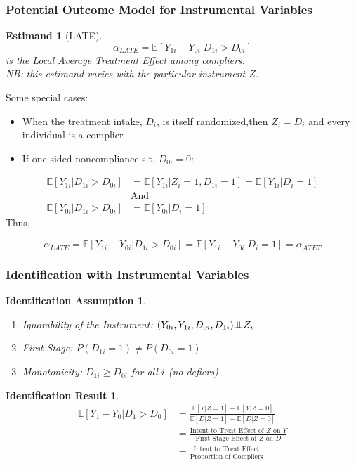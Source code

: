 \documentclass[xcolor=dvipsnames]{beamer}
\newtheorem{iass}{Identification Assumption}
\newtheorem{ires}{Identification Result}
\newtheorem{estm}{Estimand}
\newcommand\E{\mathbb{E}}
\newcommand{\indep}{{\bot\negthickspace\negthickspace\bot}}
\begin{document}
\begin{frame}
  \frametitle{Potential Outcome Model for Instrumental Variables}
\begin{estm}[LATE]
\small
$$\alpha_{LATE}=\E[Y_{1i}-Y_{0i}|D_{1i}>D_{0i}]$$ is the Local Average Treatment Effect among compliers.\\ \smallskip \footnotesize NB: this estimand varies with the particular instrument $Z$. 
\end{estm}
\normalsize
{} Some special cases: 
\footnotesize
\begin{itemize}
\item<2-> When the treatment intake, $D_i$, is itself randomized,\pause then $Z_i=D_i$ and every individual is a complier
\item<3-> If one-sided noncompliance s.t. $D_{0i}=0$: \pause
\end{itemize}
\begin{equation*}
\begin{split}
\E[Y_{1i}|D_{1i}>D_{0i}]&=\E[Y_{1i}|Z_i=1,D_{1i}=1]=\E[Y_{1i}|D_i=1]\\ 
&\mbox{And}\\
\E[Y_{0i}|D_{1i}>D_{0i}]&=\E[Y_{0i}|D_i=1]
\end{split}
\end{equation*}
Thus, 

$$\alpha_{LATE}=\E[Y_{1i}-Y_{0i}|D_{1i}>D_{0i}]=\E[Y_{1i}-Y_{0i}|D_i=1]=\alpha_{ATET}$$
\end{frame}

\begin{frame}
  \frametitle{Identification with Instrumental Variables}
\begin{iass}
\begin{enumerate}
  \item Ignorability of the Instrument: $(Y_{0i},Y_{1i}, D_{0i},D_{1i}) \indep Z_i$
  \item First Stage:  $P(D_{1i}=1) \neq P(D_{0i}=1)$
  \item Monotonicity: $D_{1i} \geq D_{0i}$ for all $i$ (no defiers)
  \end{enumerate}
\end{iass}\vspace{-.2in}
\bigskip
{}
\begin{ires}
\footnotesize
\begin{align*}
 \E[Y_1-Y_0|D_1>D_0] &= \frac{\E[Y|Z=1]-\E[Y|Z=0]}{\E[D|Z=1]-\E[D|Z=0]} \\
   &= \frac{\mbox{Intent to Treat Effect of $Z$ on $Y$}}{\mbox{First Stage Effect of $Z$ on $D$}} \\
   &= \frac{\mbox{Intent to Treat Effect}}{\mbox{Proportion of Compliers}}
\end{align*}
\end{ires}
\end{frame}
\end{document}
